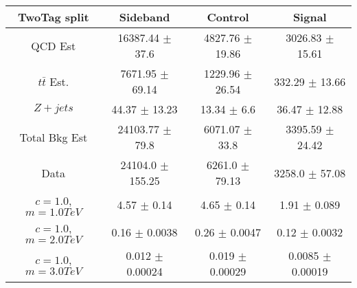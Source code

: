 \begin{footnotesize} 
\begin{tabular}{c|c|c|c} 
TwoTag split & Sideband & Control & Signal \\ 
\hline\hline 
QCD Est & 16387.44 $\pm$ 37.6 & 4827.76 $\pm$ 19.86 & 3026.83 $\pm$ 15.61\\ 
$t\bar{t}$ Est.  & 7671.95 $\pm$ 69.14 & 1229.96 $\pm$ 26.54 & 332.29 $\pm$ 13.66\\ 
$Z+jets$ & 44.37 $\pm$ 13.23 & 13.34 $\pm$ 6.6 & 36.47 $\pm$ 12.88\\ 
Total Bkg Est & 24103.77 $\pm$ 79.8 & 6071.07 $\pm$ 33.8 & 3395.59 $\pm$ 24.42\\ 
Data & 24104.0 $\pm$ 155.25 & 6261.0 $\pm$ 79.13 & 3258.0 $\pm$ 57.08\\ 
$c=1.0$,$m=1.0TeV$ & 4.57 $\pm$ 0.14 & 4.65 $\pm$ 0.14 & 1.91 $\pm$ 0.089\\ 
$c=1.0$,$m=2.0TeV$ & 0.16 $\pm$ 0.0038 & 0.26 $\pm$ 0.0047 & 0.12 $\pm$ 0.0032\\ 
$c=1.0$,$m=3.0TeV$ & 0.012 $\pm$ 0.00024 & 0.019 $\pm$ 0.00029 & 0.0085 $\pm$ 0.00019\\ 
\hline\hline 
\end{tabular} 
\end{footnotesize} 
\newline 
